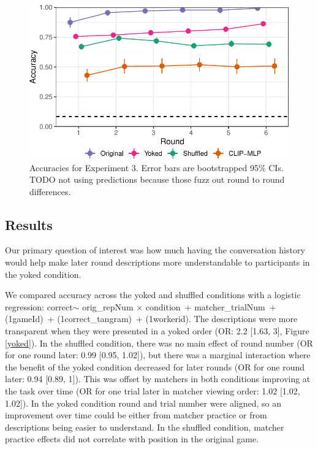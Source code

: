 \documentclass[10pt, letterpaper]{article}
\begin{document}
\begin{CodeChunk}
\begin{figure}[t]

{\centering \includegraphics[width=0.9\linewidth]{figs/fig-yoked-1} 

}

\caption[Accuracies for Experiment 3]{Accuracies for Experiment 3. Error bars are bootstrapped 95\% CIs. TODO not using predictions because those fuzz out round to round differences. \label{yoked}}\label{fig:fig-yoked}
\end{figure}
\end{CodeChunk}

\subsection{Results}\label{results-2}

Our primary question of interest was how much having the conversation
history would help make later round descriptions more understandable to
participants in the yoked condition.

We compared accuracy across the yoked and shuffled conditions with a
logistic regression: correct\(\sim\) orig\_repNum \(\times\) condition~+
matcher\_trialNum~+ (1\textbar gameId)~+ (1\textbar correct\_tangram)~+
(1\textbar workerid). The descriptions were more transparent when they
were presented in a yoked order (OR: 2.2 {[}1.63, 3{]}, Figure
\ref{yoked}). In the shuffled condition, there was no main effect of
round number (OR for one round later: 0.99 {[}0.95, 1.02{]}), but there
was a marginal interaction where the benefit of the yoked condition
decreased for later rounds (OR for one round later: 0.94 {[}0.89, 1{]}).
This was offset by matchers in both conditions improving at the task
over time (OR for one trial later in matcher viewing order: 1.02
{[}1.02, 1.02{]}). In the yoked condition round and trial number were
aligned, so an improvement over time could be either from matcher
practice or from descriptions being easier to understand. In the
shuffled condition, matcher practice effects did not correlate with
position in the original game.
\end{document}
